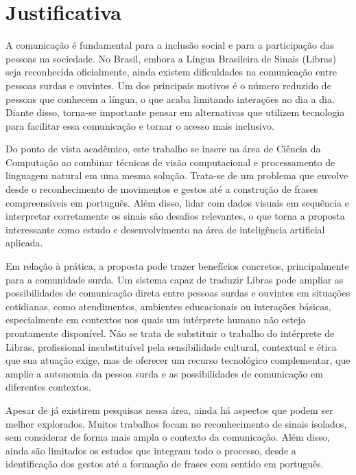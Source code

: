 \documentclass[
    12pt,                %
    openright,           %
    oneside,             %
    a4paper,             %
    english,             %
    brazil               %
]{abntex2}
\begin{document}
\section{Justificativa}
\label{sec:justificativa}

A comunicação é fundamental para a inclusão social e para a participação das pessoas na sociedade. No Brasil, embora a Língua Brasileira de Sinais (Libras) seja reconhecida oficialmente, ainda existem dificuldades na comunicação entre pessoas surdas e ouvintes. Um dos principais motivos é o número reduzido de pessoas que conhecem a língua, o que acaba limitando interações no dia a dia. Diante disso, torna-se importante pensar em alternativas que utilizem tecnologia para facilitar essa comunicação e tornar o acesso mais inclusivo.

Do ponto de vista acadêmico, este trabalho se insere na área de Ciência da Computação ao combinar técnicas de visão computacional e processamento de linguagem natural em uma mesma solução. Trata-se de um problema que envolve desde o reconhecimento de movimentos e gestos até a construção de frases compreensíveis em português. Além disso, lidar com dados visuais em sequência e interpretar corretamente os sinais são desafios relevantes, o que torna a proposta interessante como estudo e desenvolvimento na área de inteligência artificial aplicada.

Em relação à prática, a proposta pode trazer benefícios concretos, principalmente para a comunidade surda. Um sistema capaz de traduzir Libras pode ampliar as possibilidades de comunicação direta entre pessoas surdas e ouvintes em situações cotidianas, como atendimentos, ambientes educacionais ou interações básicas, especialmente em contextos nos quais um intérprete humano não esteja prontamente disponível. Não se trata de substituir o trabalho do intérprete de Libras, profissional insubstituível pela sensibilidade cultural, contextual e ética que sua atuação exige, mas de oferecer um recurso tecnológico complementar, que amplie a autonomia da pessoa surda e as possibilidades de comunicação em diferentes contextos.

Apesar de já existirem pesquisas nessa área, ainda há aspectos que podem ser melhor explorados. Muitos trabalhos focam no reconhecimento de sinais isolados, sem considerar de forma mais ampla o contexto da comunicação. Além disso, ainda são limitados os estudos que integram todo o processo, desde a identificação dos gestos até a formação de frases com sentido em português.
\end{document}
